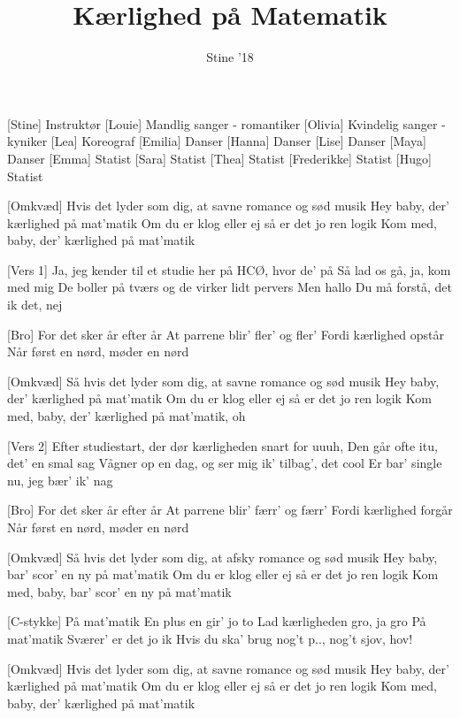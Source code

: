 \documentclass[a4paper,11pt]{article}
\title{Kærlighed på Matematik}
\author{Stine '18}
\begin{document}
\maketitle

\begin{roles}
[Stine] Instruktør
[Louie] Mandlig sanger - romantiker
[Olivia] Kvindelig sanger - kyniker
[Lea] Koreograf
[Emilia] Danser
[Hanna] Danser
[Lise] Danser
[Maya] Danser
[Emma] Statist
[Sara] Statist
[Thea] Statist
[Frederikke] Statist
[Hugo] Statist
\end{roles}

\begin{song}
[Omkvæd] Hvis det lyder som dig, at savne romance og sød musik
Hey baby, der’ kærlighed på mat’matik
Om du er klog eller ej så er det jo ren logik
Kom med, baby, der’ kærlighed på mat’matik

[Vers 1] Ja, jeg kender til et studie her på HCØ, 
hvor de’ på
Så lad os gå, ja, kom med mig
De boller på tværs og de virker lidt pervers
Men hallo
Du må forstå, det ik det, nej

[Bro] For det sker år efter år
At parrene blir’ fler’ og fler’ 
Fordi kærlighed opstår 
Når først en nørd, møder en nørd

[Omkvæd] Så hvis det lyder som dig, at savne romance og sød musik
Hey baby, der’ kærlighed på mat’matik
Om du er klog eller ej så er det jo ren logik
Kom med, baby, der’ kærlighed på mat’matik, oh


[Vers 2] Efter studiestart, der dør kærligheden snart for uuuh, 
Den går ofte itu, det' en smal sag
Vågner op en dag, og ser mig ik' tilbag', det cool
Er bar' single nu, jeg bær' ik' nag

[Bro] For det sker år efter år
At parrene blir’ færr’ og færr’ 
Fordi kærlighed forgår 
Når først en nørd, møder en nørd

[Omkvæd] Så hvis det lyder som dig, at afsky romance og sød musik
Hey baby, bar' scor' en ny på mat’matik
Om du er klog eller ej så er det jo ren logik
Kom med, baby, bar' scor' en ny på mat’matik

[C-stykke] På mat’matik
En plus en gir’ jo to
Lad kærligheden gro, ja gro
 På mat’matik
Sværer' er det jo ik
Hvis du ska' brug nog't p.., nog't sjov, hov!


[Omkvæd] Hvis det lyder som dig, at savne romance og sød musik
Hey baby, der’ kærlighed på mat’matik
Om du er klog eller ej så er det jo ren logik
Kom med, baby, der’ kærlighed på mat’matik

\end{song}
\end{document}
